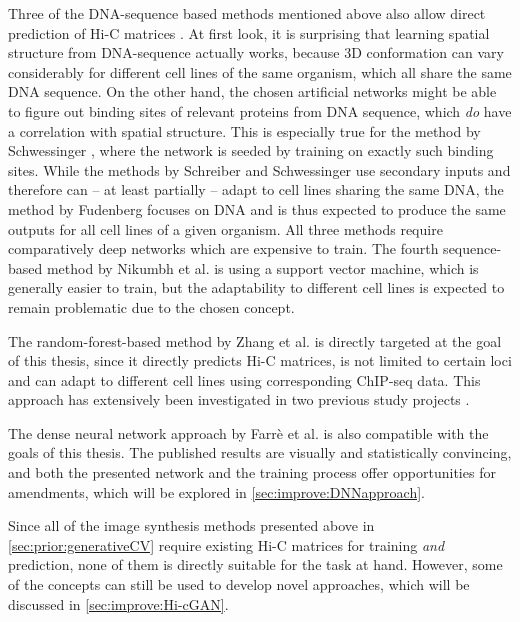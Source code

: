 Three of the DNA-sequence based methods mentioned above also allow direct prediction of Hi-C matrices 
\cite{Schreiber2017, Fudenberg2020, Schwessinger2019}.
At first look, it is surprising that learning spatial structure from DNA-sequence actually works, 
because 3D conformation can vary considerably for different cell lines of the same organism, which all share the same DNA sequence.
On the other hand, the chosen artificial networks might be able to figure out binding sites of relevant proteins from DNA sequence,
which \emph{do} have a correlation with spatial structure. 
This is especially true for the method by Schwessinger \cite{Schwessinger2019},
where the network is seeded by training on exactly such binding sites.
While the methods by Schreiber and Schwessinger use secondary inputs and therefore can -- at least partially -- 
adapt to cell lines sharing the same DNA, the method by Fudenberg focuses on DNA and is thus 
expected to produce the same outputs for all cell lines of a given organism.
All three methods require comparatively deep networks which are expensive to train.
The fourth sequence-based method by Nikumbh et al. \cite{Nikumbh2017} is using a support vector machine, which is generally easier to train,
but the adaptability to different cell lines is expected to remain problematic due to the chosen concept.

The random-forest-based method by Zhang et al. \cite{Zhang2019} is directly targeted at the goal of this thesis,
since it directly predicts Hi-C matrices, is not limited to certain loci and can adapt to different cell lines using 
corresponding ChIP-seq data.
This approach has extensively been investigated in two previous study projects \cite{Krauth2020,Bajorat2019}.

The dense neural network approach by Farr\`e et al. \cite{Farre2018a} is also compatible with the goals of this thesis.
The published results are visually and statistically convincing, and both the presented network and the training process offer
opportunities for amendments, which will be explored in \cref{sec:improve:DNNapproach}.

Since all of the image synthesis methods presented above in \cref{sec:prior:generativeCV} require existing Hi-C matrices 
for training \emph{and} prediction, none of them is directly suitable for the task at hand.
However, some of the concepts can still be used to develop novel approaches, which will be discussed in \cref{sec:improve:Hi-cGAN}.
\clearpage
